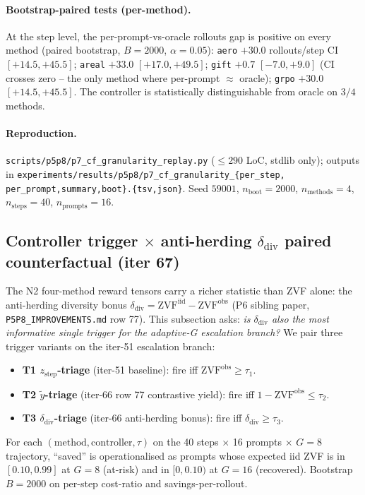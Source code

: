 \paragraph{Bootstrap-paired tests (per-method).}
At the step level, the per-prompt-vs-oracle rollouts gap is
positive on every method (paired bootstrap, $B{=}2000$,
$\alpha{=}0.05$):
\texttt{aero} $+30.0$ rollouts/step CI $[+14.5, +45.5]$;
\texttt{areal} $+33.0$ $[+17.0, +49.5]$; \texttt{gift} $+0.7$
$[-7.0, +9.0]$ (CI crosses zero -- the only method where
per-prompt $\approx$ oracle); \texttt{grpo} $+30.0$ $[+14.5,
+45.5]$. The controller is statistically distinguishable from
oracle on $3/4$ methods.

\paragraph{Reproduction.}
\texttt{scripts/p5p8/p7\_cf\_granularity\_replay.py}
($\leq 290$ LoC, stdlib only); outputs in
\texttt{experiments/results/p5p8/p7\_cf\_granularity\_\{per\_step,
per\_prompt,summary,boot\}.\{tsv,json\}}. Seed $59001$,
$n_{\mathrm{boot}}{=}2000$, $n_{\mathrm{methods}}{=}4$,
$n_{\mathrm{steps}}{=}40$, $n_{\mathrm{prompts}}{=}16$.
\subsection{Controller trigger $\times$ anti-herding $\delta_{\mathrm{div}}$
paired counterfactual (iter 67)}
\label{sec:p7-controller-antiherding}

The N2 four-method reward tensors carry a richer statistic than ZVF alone:
the anti-herding diversity bonus $\delta_{\mathrm{div}} = \mathrm{ZVF}^{\mathrm{iid}}
- \mathrm{ZVF}^{\mathrm{obs}}$ (P6 sibling paper, \texttt{P5P8\_IMPROVEMENTS.md} row 77).
This subsection asks: \emph{is $\delta_{\mathrm{div}}$ also the most informative
single trigger for the adaptive-G escalation branch?} We pair three
trigger variants on the iter-51 escalation branch:
\begin{itemize}
    \item \textbf{T1 $z_{\mathrm{step}}$-triage} (iter-51 baseline):
        fire iff $\mathrm{ZVF}^{\mathrm{obs}} \geq \tau_1$.
    \item \textbf{T2 $\tilde{y}$-triage} (iter-66 row 77 contrastive yield):
        fire iff $1 - \mathrm{ZVF}^{\mathrm{obs}} \leq \tau_2$.
    \item \textbf{T3 $\delta_{\mathrm{div}}$-triage} (iter-66 anti-herding bonus):
        fire iff $\delta_{\mathrm{div}} \geq \tau_3$.
\end{itemize}
For each $(\mathrm{method}, \mathrm{controller}, \tau)$ on the
40 steps $\times$ 16 prompts $\times$ $G{=}8$ trajectory,
``saved'' is operationalised as prompts whose expected iid ZVF is in
$[0.10, 0.99]$ at $G{=}8$ (at-risk) and in $[0, 0.10)$ at $G{=}16$ (recovered).
Bootstrap $B{=}2000$ on per-step cost-ratio and savings-per-rollout.

